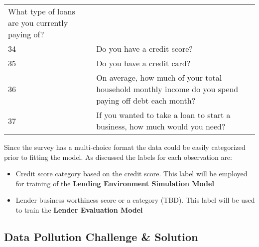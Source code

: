 \begin{longtable}[]{@{}ll@{}}
\begin{minipage}[t]{0.89\columnwidth}
What type of loans are you currently paying of?\strut
\end{minipage}\tabularnewline
\begin{minipage}[t]{0.05\columnwidth}\raggedright
34\strut
\end{minipage} & \begin{minipage}[t]{0.89\columnwidth}\raggedright
Do you have a credit score?\strut
\end{minipage}\tabularnewline
\begin{minipage}[t]{0.05\columnwidth}\raggedright
35\strut
\end{minipage} & \begin{minipage}[t]{0.89\columnwidth}\raggedright
Do you have a credit card?\strut
\end{minipage}\tabularnewline
\begin{minipage}[t]{0.05\columnwidth}\raggedright
36\strut
\end{minipage} & \begin{minipage}[t]{0.89\columnwidth}\raggedright
On average, how much of your total household monthly income do you spend
paying off debt each month?\strut
\end{minipage}\tabularnewline
\begin{minipage}[t]{0.05\columnwidth}\raggedright
37\strut
\end{minipage} & \begin{minipage}[t]{0.89\columnwidth}\raggedright
If you wanted to take a loan to start a business, how much would you
need?\strut
\end{minipage}\tabularnewline
\bottomrule
\end{longtable}

Since the survey has a multi-choice format the data could be easily
categorized prior to fitting the model. As discussed the labels for each
observation are:

\begin{itemize}
\item
  Credit score category based on the credit score. This label will be
  employed for training of the \textbf{Lending Environment Simulation
  Model}
\item
  Lender business worthiness score or a category (TBD). This label will
  be used to train the \textbf{Lender Evaluation Model}
\end{itemize}

\hypertarget{data-pollution-challenge-solution}{%
\subsection{Data Pollution Challenge \&
Solution}\label{data-pollution-challenge-solution}}

